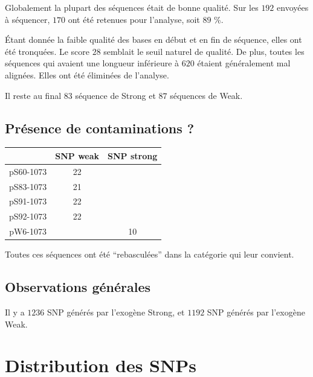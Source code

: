 \documentclass[a4paper]{tufte-handout}
\begin{document}
Globalement la plupart des séquences était de bonne qualité. Sur les \(192\)
envoyées à séquencer, \(170\) ont été retenues pour l'analyse, soit \(89\) \%.

Étant donnée la faible qualité des bases en début et en fin de séquence, elles
ont été tronquées. Le score \(28\) semblait le seuil naturel de qualité. De plus,
toutes les séquences qui avaient une longueur inférieure à \(620\) étaient
généralement mal alignées. Elles ont été éliminées de l'analyse. 

Il reste au final \(83\) séquence de Strong et \(87\) séquences de Weak. 

\subsection{Présence de contaminations ?}
\label{sec:orgheadline2}

\begin{center}
\small
\begin{tabular}{ccc}
\toprule
 & \textbf{SNP weak} & \textbf{SNP strong}\\
\midrule
pS60-1073 & 22 & \\
pS83-1073 & 21 & \\
pS91-1073 & 22 & \\
pS92-1073 & 22 & \\
pW6-1073 &  & 10\\
\bottomrule
\end{tabular}
\end{center}

Toutes ces séquences ont été ``rebasculées'' dans la catégorie qui leur
convient. 
\subsection{Observations générales}
\label{sec:orgheadline3}

\begin{margintable}
  \small
  
\end{margintable}

Il y a \(1236\) SNP générés par l'exogène Strong, et \(1192\) SNP générés par l'exogène
Weak. \\
\begin{center}
  
\end{center}

\newpage
\section{Distribution des SNPs}
\label{sec:orgheadline7}
\end{document}
